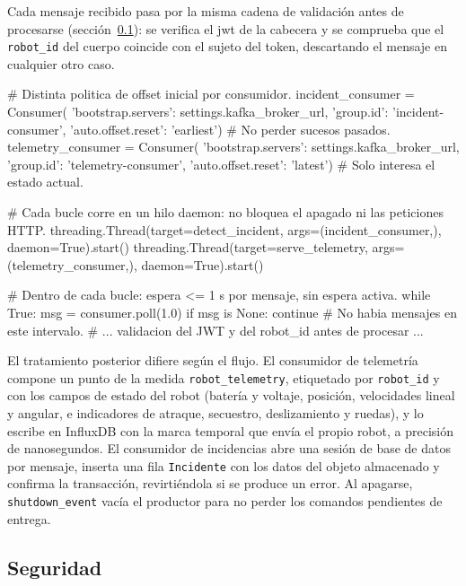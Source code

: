Cada mensaje recibido pasa por la misma cadena de validación antes de procesarse
(sección~\ref{sec:seguridad}): se verifica el \gls{jwt} de la cabecera y se comprueba
que el \texttt{robot\_id} del cuerpo coincide con el sujeto del token, descartando el
mensaje en cualquier otro caso.

%
\begin{pythoncode}[title={Consumidores en hilos daemon y sondeo del broker (server.py)}, label={lst:consumers}]
# Distinta politica de offset inicial por consumidor.
incident_consumer = Consumer({
    'bootstrap.servers': settings.kafka_broker_url,
    'group.id': 'incident-consumer',
    'auto.offset.reset': 'earliest'})   # No perder sucesos pasados.
telemetry_consumer = Consumer({
    'bootstrap.servers': settings.kafka_broker_url,
    'group.id': 'telemetry-consumer',
    'auto.offset.reset': 'latest'})     # Solo interesa el estado actual.

# Cada bucle corre en un hilo daemon: no bloquea el apagado ni las peticiones HTTP.
threading.Thread(target=detect_incident,
                 args=(incident_consumer,), daemon=True).start()
threading.Thread(target=serve_telemetry,
                 args=(telemetry_consumer,), daemon=True).start()

# Dentro de cada bucle: espera <= 1 s por mensaje, sin espera activa.
while True:
    msg = consumer.poll(1.0)
    if msg is None:
        continue                        # No habia mensajes en este intervalo.
    # ... validacion del JWT y del robot_id antes de procesar ...
\end{pythoncode}%

El tratamiento posterior difiere según el flujo. El consumidor de telemetría compone
un punto de la medida \texttt{robot\_telemetry}, etiquetado por \texttt{robot\_id} y
con los campos de estado del robot (batería y voltaje, posición, velocidades lineal y
angular, e indicadores de atraque, secuestro, deslizamiento y ruedas), y lo escribe en
InfluxDB con la marca temporal que envía el propio robot, a precisión de nanosegundos.
El consumidor de incidencias abre una sesión de base de datos por mensaje, inserta una
fila \texttt{Incidente} con los datos del objeto almacenado y confirma la transacción,
revirtiéndola si se produce un error. Al apagarse, \texttt{shutdown\_event} vacía el
productor para no perder los comandos pendientes de entrega.

\subsection{Seguridad}
\label{sec:seguridad}

